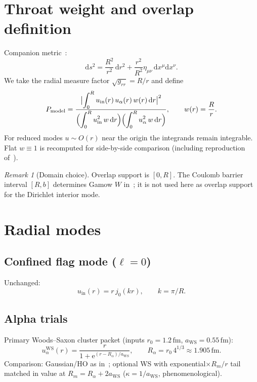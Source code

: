 \documentclass[11pt,a4paper]{article}
\theoremstyle{remark}
\newtheorem*{remark}{Remark}
\newcommand{\dd}{\mathrm{d}}
\newcommand{\ee}{\mathrm{e}}
\begin{document}
\section{Throat weight and overlap definition}

Companion metric~\cite{NuclearDecay2026}:
\begin{equation}
\dd s^2 = \frac{R^2}{r^2}\,\dd r^2 + \frac{r^2}{R^2}\eta_{\mu\nu}\,\dd x^\mu\dd x^\nu.
\end{equation}
We take the radial measure factor $\sqrt{g_{rr}}=R/r$ and define
\begin{equation}
P_{\mathrm{model}}
=
\frac{\bigl|\displaystyle\int_0^R u_{\mathrm{in}}(r)\,u_\alpha(r)\,w(r)\,\dd r\bigr|^2}
{\displaystyle
\Bigl(\int_0^R u_{\mathrm{in}}^2\,w\,\dd r\Bigr)
\Bigl(\int_0^R u_\alpha^2\,w\,\dd r\Bigr)},
\qquad w(r)=\frac{R}{r}.
\end{equation}
For reduced modes $u\sim O(r)$ near the origin the integrands remain
integrable.  Flat $w\equiv 1$ is recomputed for side-by-side comparison
(including reproduction of~\cite{PalphaOverlap2026}).

\begin{remark}[Domain choice]
Overlap support is $[0,R]$.  The Coulomb barrier interval $[R,b]$
determines Gamow $W$ in~\cite{NuclearDecay2026}; it is not used here as
overlap support for the Dirichlet interior mode.
\end{remark}

\section{Radial modes}

\subsection{Confined flag mode ($\ell=0$)}
Unchanged:
\begin{equation}
u_{\mathrm{in}}(r)=r\,j_0(kr),\qquad k=\pi/R.
\end{equation}

\subsection{Alpha trials}
Primary Woods--Saxon cluster packet (inputs $r_0=1.2\,\mathrm{fm}$,
$a_{\mathrm{WS}}=0.55\,\mathrm{fm}$):
\begin{equation}
u_\alpha^{\mathrm{WS}}(r)
=
\frac{r}{1+\ee^{(r-R_\alpha)/a_{\mathrm{WS}}}},
\qquad
R_\alpha=r_0\,4^{1/3}\approx 1.905\,\mathrm{fm}.
\end{equation}
Comparison: Gaussian/HO as in~\cite{PalphaOverlap2026}; optional
WS with exponential$\times R_m/r$ tail matched in value at
$R_m=R_\alpha+2a_{\mathrm{WS}}$ ($\kappa=1/a_{\mathrm{WS}}$,
phenomenological).
\end{document}

